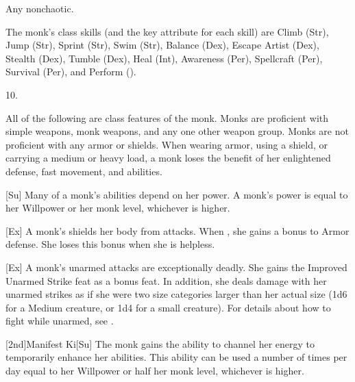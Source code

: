  Any nonchaotic.

The monk's class skills (and the key attribute for each skill) are Climb (Str), Jump (Str), Sprint (Str), Swim (Str), Balance (Dex), Escape Artist (Dex), Stealth (Dex), Tumble (Dex), Heal (Int), Awareness (Per), Spellcraft (Per), Survival (Per), and Perform (\x).

10.

All of the following are class features of the monk.
Monks are proficient with simple weapons, monk weapons, and any one other weapon group.
Monks are not proficient with any armor or shields.
When wearing armor, using a shield, or carrying a medium or heavy load, a monk loses the benefit of her enlightened defense, fast movement, and \ki abilities.

[Su]
Many of a monk's abilities depend on her \ki power.
A monk's \ki power is equal to her Willpower or her monk level, whichever is higher.

[Ex]
A monk's \ki shields her body from attacks.
When \monkunencumbered, she gains a  bonus to Armor defense.
She loses this bonus when she is helpless.

\begin{comment}  %
\cf{Mnk}{Ki Ward}[Ex]
When \monkunencumbered, a monk gains a \plus1 armor bonus to AC at 2nd level.
This bonus increases by 1 for every two monk levels thereafter (\plus2 at 4th, \plus3 at 6th, etc.).

\par The monk loses this bonus when she is
immobilized or helpless, when she wears any armor, when she carries a shield, or when she carries a medium or heavy load.
\end{comment}

[Ex]
A monk's unarmed attacks are exceptionally deadly.
She gains the Improved Unarmed Strike feat as a bonus feat.
In addition, she deals damage with her unarmed strikes as if she were two size categories larger than her actual size (1d6 for a Medium creature, or 1d4 for a small creature).
For details about how to fight while unarmed, see .

[2nd]{Manifest Ki}[Su]
The monk gains the ability to channel her \ki energy to temporarily enhance her abilities.
This ability can be used a number of times per day equal to her Willpower or half her monk level, whichever is higher.

